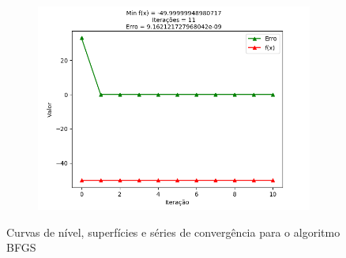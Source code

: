 \documentclass[a4paper, 12pt]{article}
\begin{document}
\begin{figure}[H]
\begin{subfigure}{0.3\textwidth}
  \includegraphics[width=\linewidth]{5/MPFE/A/BFGS/convergencia.png}
\end{subfigure}
\caption{Curvas de nível, superfícies e séries de convergência para o algoritmo BFGS}
\label{fig:Q5ABFGS}
\end{figure}
\end{document}
